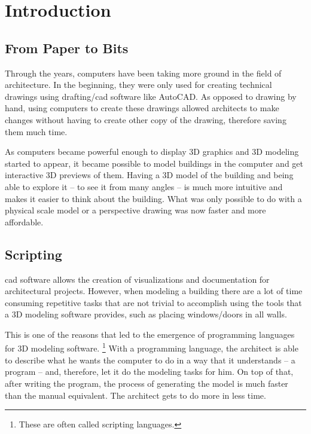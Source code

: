 
\chapter{Introduction}
\label{chapter:introduction}


\section{From Paper to Bits}

Through the years, computers have been taking more ground in the field of architecture.
In the beginning, they were only used for creating technical drawings using drafting/\gls{cad} software like AutoCAD.
As opposed to drawing by hand, using computers to create these drawings allowed architects to make changes without having to create other copy of the drawing, therefore saving them much time.

As computers became powerful enough to display 3D graphics and 3D modeling started to appear, it became possible to model buildings in the computer and get interactive 3D previews of them.
Having a 3D model of the building and being able to explore it -- to see it from many angles -- is much more intuitive and makes it easier to think about the building.
What was only possible to do with a physical scale model or a perspective drawing was now faster and more affordable.


\section{Scripting}
\gls{cad} software allows the creation of visualizations and documentation for architectural projects.
However, when modeling a building there are a lot of time consuming repetitive tasks that are not trivial to accomplish using the tools that a 3D modeling software provides, such as placing windows/doors in all walls.

This is one of the reasons that led to the emergence of programming languages for 3D modeling software.%
\footnote{These are often called scripting languages.}
With a programming language, the architect is able to describe what he wants the computer to do in a way that it understands -- a program -- and, therefore, let it do the modeling tasks for him.
On top of that, after writing the program, the process of generating the model is much faster than the manual equivalent.
The architect gets to do more in less time.

